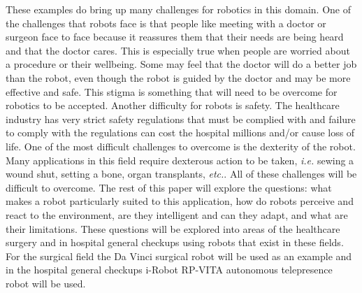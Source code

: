 \documentclass[11pt,conference]{IEEEtran}
\begin{document}
\newline
\indent These examples do bring up many challenges for robotics in this domain. One of the challenges that robots face is that people like meeting with a doctor or surgeon face to face because it reassures them that their needs are being heard and that the doctor cares.  This is especially true when people are worried about a procedure or their wellbeing.  Some may feel that the doctor will do a better job than the robot, even though the robot is guided by the doctor and may be more effective and safe.  This stigma is something that will need to be overcome for robotics to be accepted.  Another difficulty for robots is safety.  The healthcare industry has very strict safety regulations that must be complied with and failure to comply with the regulations can cost the hospital millions and/or cause loss of life.  One of the most difficult challenges to overcome is the dexterity of the robot.  Many applications in this field require dexterous action to be taken, \textit{i.e.} sewing a wound shut, setting a bone, organ transplants, \textit{etc.}.  All of these challenges will be difficult to overcome. 
\newline
\indent The rest of this paper will explore the questions: what makes a robot particularly suited to this application, how do robots perceive and react to the environment,  are they intelligent and can they adapt, and what are their limitations.  These questions will be explored into areas of the healthcare surgery and in hospital general checkups using robots that exist in these fields.  For the surgical field the Da Vinci surgical robot will be used as an example and in the hospital general checkups i-Robot RP-VITA autonomous telepresence robot will be used. 
\end{document}
